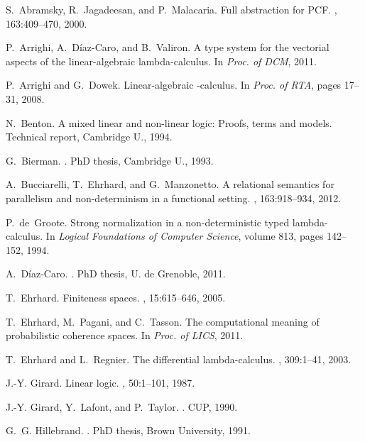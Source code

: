 \documentclass[10pt]{article}
\theoremstyle{plain}
\theoremstyle{definition}
\begin{document}
\begin{thebibliography}{10}

S.~Abramsky, R.~Jagadeesan, and P.~Malacaria.
\newblock Full abstraction for {PCF}.
, 163:409--470, 2000.

P.~Arrighi, A.~D\'{i}az-Caro, and B.~Valiron.
\newblock A type system for the vectorial aspects of the linear-algebraic
  lambda-calculus.
\newblock In {\em Proc. of DCM}, 2011.

P.~Arrighi and G.~Dowek.
\newblock Linear-algebraic -calculus.
\newblock In {\em Proc. of RTA}, pages 17--31, 2008.

N.~Benton.
\newblock A mixed linear and non-linear logic: Proofs, terms and models.
\newblock Technical report, Cambridge U., 1994.

G.~Bierman.
.
\newblock PhD thesis, Cambridge U., 1993.

A.~Bucciarelli, T.~Ehrhard, and G.~Manzonetto.
\newblock A relational semantics for parallelism and non-determinism in a
  functional setting.
, 163:918--934, 2012.

P.~de~Groote.
\newblock Strong normalization in a non-deterministic typed lambda-calculus.
\newblock In {\em Logical Foundations of Computer Science}, volume 813, pages
  142--152, 1994.

A.~D\'{i}az-Caro.
.
\newblock PhD thesis, U. de Grenoble, 2011.

T.~Ehrhard.
\newblock Finiteness spaces.
, 15:615--646, 2005.

T.~Ehrhard, M.~Pagani, and C.~Tasson.
\newblock The computational meaning of probabilistic coherence spaces.
\newblock In {\em Proc. of LICS}, 2011.

T.~Ehrhard and L.~Regnier.
\newblock The differential lambda-calculus.
, 309:1--41, 2003.

J.-Y. Girard.
\newblock Linear logic.
, 50:1--101, 1987.

J.-Y. Girard, Y.~Lafont, and P.~Taylor.
.
\newblock CUP, 1990.

G.~G. Hillebrand.
.
\newblock PhD thesis, Brown University, 1991.


\end{thebibliography}
\end{document}
